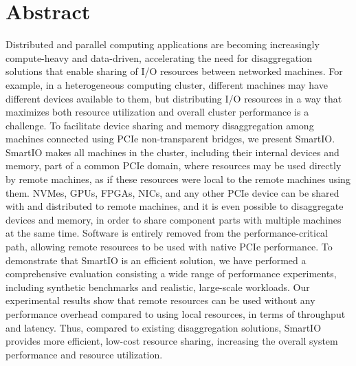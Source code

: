 \chapter{Abstract}
Distributed and parallel computing applications are becoming increasingly compute-heavy and data-driven, accelerating the need for disaggregation solutions that enable sharing of I/O resources between networked machines.
%
For example, in a heterogeneous computing cluster, different machines may have different devices available to them, but distributing I/O resources in a way that maximizes both resource utilization and overall cluster performance is a challenge.
%
To facilitate device sharing and memory disaggregation among machines connected using PCIe non-transparent bridges, we present SmartIO.
%
SmartIO makes all machines in the cluster, including their internal devices and memory, part of a common PCIe domain, where resources may be used directly by remote machines, as if these resources were local to the remote machines using them.
%
NVMes, GPUs, FPGAs, NICs, and any other PCIe device can be shared with and distributed to remote machines, and it is even possible to disaggregate devices and memory, in order to share component parts with multiple machines at the same time.
%
Software is entirely removed from the performance-critical path, allowing remote resources to be used with native PCIe performance. 
%
To demonstrate that SmartIO is an efficient solution, we have performed a comprehensive evaluation consisting a wide range of performance experiments, including synthetic benchmarks and realistic, large-scale workloads.
%
Our experimental results show that remote resources can be used without any performance overhead compared to using local resources, in terms of throughput and latency.
%
Thus, compared to existing disaggregation solutions, SmartIO provides more efficient, low-cost resource sharing, increasing the overall system performance and resource utilization.

